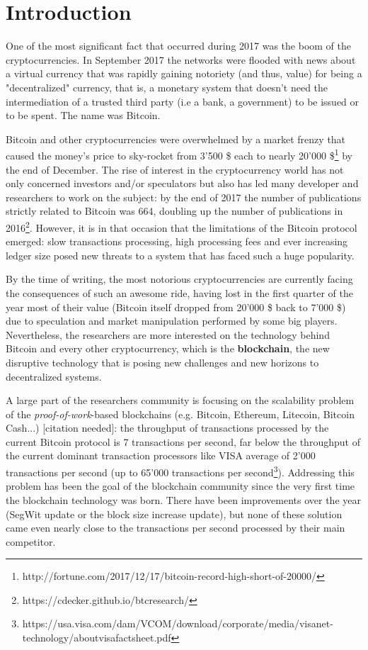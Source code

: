 
	\chapter{Introduction}
		One of the most significant fact that occurred during 2017 was the boom of the cryptocurrencies. In September 2017 the networks were flooded with news about a virtual currency that was rapidly gaining notoriety (and thus, value) for being a "decentralized" currency, that is, a monetary system that doesn't need the intermediation of a trusted third party (i.e a bank, a government) to be issued or to be spent. The name was Bitcoin.
		
		Bitcoin and other cryptocurrencies were overwhelmed by a market frenzy that caused the money's price to sky-rocket from 3'500 \$ each to nearly 20'000 \$\footnote{http://fortune.com/2017/12/17/bitcoin-record-high-short-of-20000/} by the end of December.
		The rise of interest in the cryptocurrency world has not only concerned investors and/or speculators but also has led many developer and researchers to work on the subject: by the end of 2017 the number of publications strictly related to Bitcoin was 664, doubling up the number of publications in 2016\footnote{https://cdecker.github.io/btcresearch/}. However, it is in that occasion that the limitations of the Bitcoin protocol emerged: slow transactions processing, high processing fees and ever increasing ledger size posed new threats to a system that has faced such a huge popularity.
		
		By the time of writing, the most notorious cryptocurrencies are currently facing the consequences of such an awesome ride, having lost in the first quarter of the year most of their value (Bitcoin itself dropped from 20'000 \$ back to 7'000 \$) due to speculation and market manipulation performed by some big players.  Nevertheless, the researchers are more interested on the technology behind Bitcoin and every other cryptocurrency, which is the \textbf{blockchain}, the new disruptive technology that is posing new challenges and new horizons to decentralized systems. 
		
		A large part of the researchers community is focusing on the scalability problem of the \textit{proof-of-work}-based blockchains (e.g. Bitcoin, Ethereum, Litecoin, Bitcoin Cash...) [citation needed]: the throughput of transactions processed by the current Bitcoin protocol is 7 transactions per second, far below the throughput of the current dominant transaction processors like VISA average of 2'000 transactions per second (up to 65'000 transactions per second\footnote{https://usa.visa.com/dam/VCOM/download/corporate/media/visanet-technology/aboutvisafactsheet.pdf}). Addressing this problem has been the goal of the blockchain community since the very first time the blockchain technology was born. There have been improvements over the year (SegWit update or the block size increase update), but none of these solution came even nearly close to the transactions per second processed by their main competitor.

